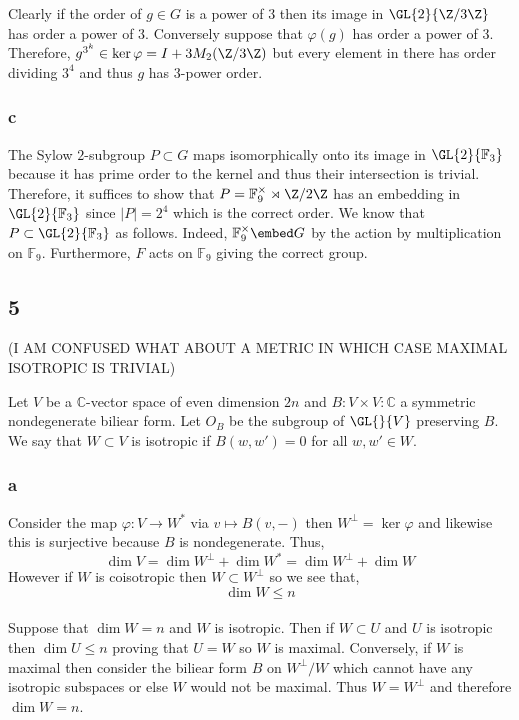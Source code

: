 \documentclass[12pt]{article}
\renewcommand{\C}{\mathbb{C}}
\renewcommand{\F}{\mathbb{F}}
\begin{document}
Clearly if the order of $g \in G$ is a power of $3$ then its image in $\GL{2}{\Z/3\Z}$ has order a power of $3$. Conversely suppose that $\varphi  (g)$ has order a power of $3$. Therefore, $g^{3^k} \in \ker{\varphi} = I + 3 M_2(\Z / 3 \Z)$ but every element in there has order dividing $3^4$ and thus $g$ has $3$-power order.

\subsubsection{c} 

The Sylow $2$-subgroup $P \subset G$ maps isomorphically onto its image in $\GL{2}{\F_3}$ because it has prime order to the kernel and thus their intersection is trivial.
\bigskip\\
Therefore, it suffices to show that $P = \F_9^\times \rtimes \Z / 2 \Z$ has an embedding in $\GL{2}{\F_3}$ since $|P| = 2^4$ which is the correct order. We know that $P \subset \GL{2}{\F_3}$ as follows. Indeed, $\F_9^\times \embed G$ by the action by multiplication on $\F_9$. Furthermore, $F$ acts on $\F_9$ giving the correct group. 


\subsection{5}

(I AM CONFUSED WHAT ABOUT A METRIC IN WHICH CASE MAXIMAL ISOTROPIC IS TRIVIAL)

Let $V$ be a $\C$-vector space of even dimension $2n$ and $B : V \times V : \C$ a symmetric nondegenerate biliear form. Let $O_B$ be the subgroup of $\GL{}{V}$ preserving $B$. We say that $W \subset V$ is isotropic if $B(w,w') = 0$ for all $w,w' \in W$.

\subsubsection{a}

Consider the map $\varphi : V \to W^*$ via $v \mapsto B(v,-)$ then $W^\perp = \ker{\varphi}$ and likewise this is surjective because $B$ is nondegenerate. Thus,
\[ \dim{V} = \dim{W^\perp} + \dim{W^*} = \dim{W^\perp} + \dim{W} \]
However if $W$ is coisotropic then $W \subset W^\perp$ so we see that, 
\[ \dim{W} \le n \] 
\bigskip\\
Suppose that $\dim{W} = n$ and $W$ is isotropic. Then if $W \subset U$ and $U$ is isotropic then $\dim{U} \le n$ proving that $U = W$ so $W$ is maximal. Conversely, if $W$ is maximal then consider the biliear form $B$ on $W^\perp / W$ which cannot have any isotropic subspaces or else $W$ would not be maximal. Thus $W = W^\perp$ and therefore $\dim{W} = n$.
\end{document}
